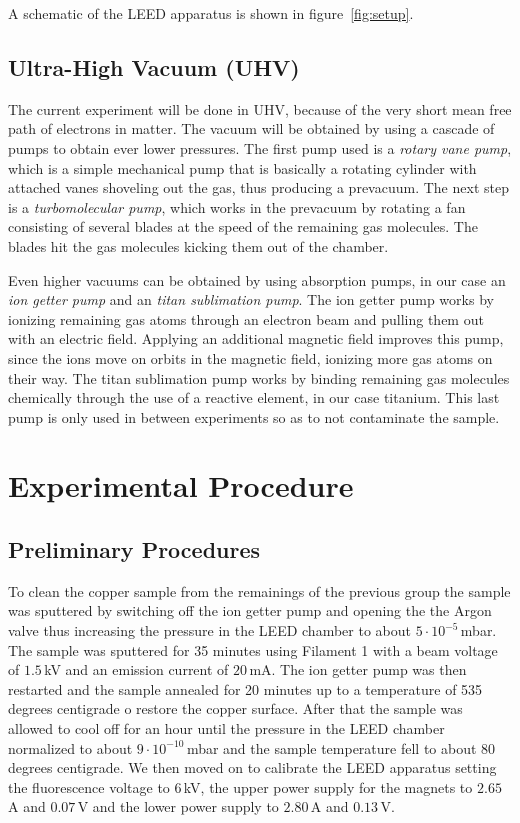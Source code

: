 \documentclass[a4paper,10pt]{scrartcl}
\begin{document}
A schematic of the LEED apparatus is shown in figure~\ref{fig:setup}.

\subsection{Ultra-High Vacuum (UHV)}

The current experiment will be done in UHV, because of the very short mean free path of electrons in matter. The vacuum will be obtained by using a cascade of pumps to obtain ever lower pressures.  The first pump used is a \textit{rotary vane pump}, which is a simple mechanical pump that is basically a rotating cylinder with attached vanes shoveling out the gas, thus producing a prevacuum. The next step is a \textit{turbomolecular pump}, which works in the prevacuum by rotating a fan consisting of several blades at the speed of the remaining gas molecules. The blades hit the gas molecules kicking them out of the chamber. 

Even higher vacuums can be obtained by using absorption pumps, in our case an \textit{ion getter pump} and an \textit{titan sublimation pump}. The ion getter pump works by ionizing remaining gas atoms through an electron beam and pulling them out with an electric field. Applying an additional magnetic field improves this pump, since the ions move on orbits in the magnetic field, ionizing more gas atoms on their way. The titan sublimation pump works by binding remaining gas molecules chemically through the use of a reactive element, in our case titanium. This last pump is only used in between experiments so as to not contaminate the sample.

\section{Experimental Procedure}

\subsection{Preliminary Procedures}

To clean the copper sample from the remainings of the previous group the sample was sputtered by switching off the ion getter pump and opening the the Argon valve thus increasing the pressure in the LEED chamber to about $5 \cdot 10^{-5}\,$mbar. The sample was sputtered for 35 minutes using Filament 1 with a beam voltage of $1.5\,$kV and an emission current of $20\,$mA. The ion getter pump was then restarted and the sample annealed for 20 minutes up to a temperature of 535 degrees centigrade o restore the copper surface. After that the sample was allowed to cool off for an hour until the pressure in the LEED chamber normalized to about $9 \cdot 10^{-10}\,$mbar and the sample temperature fell to about 80 degrees centigrade. We then moved on to calibrate the LEED apparatus setting the fluorescence voltage to $6\,$kV, the upper power supply for the magnets to $2.65\,$A and $0.07\,$V and the lower power supply to $2.80\,$A and $0.13\,$V.
\end{document}
